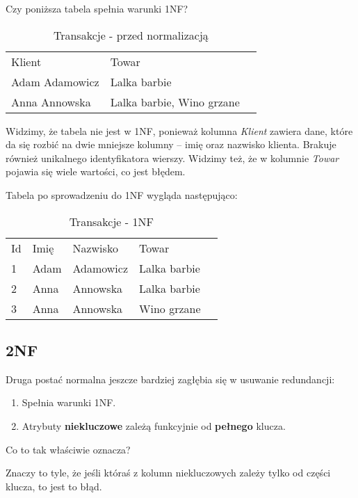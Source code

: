 Czy poniższa tabela spełnia warunki 1NF?

\begin{table}[H]
\centering
\caption{Transakcje - przed normalizacją}
\begin{tabular}{|l|l|l}
\cline{1-2}
Klient         & Towar          & \\ \cline{1-2}
Adam Adamowicz & Lalka barbie   & \\ \cline{1-2}
Anna Annowska  & Lalka barbie, Wino grzane &  \\ \cline{1-2}
\end{tabular}
\end{table}

Widzimy, że tabela nie jest w 1NF, ponieważ kolumna \textit{Klient} zawiera dane, które da się rozbić na dwie mniejsze kolumny -- imię oraz nazwisko klienta.
Brakuje również unikalnego identyfikatora wierszy.
Widzimy też, że w kolumnie \textit{Towar} pojawia się wiele wartości, co jest błędem.

Tabela po sprowadzeniu do 1NF wygląda następująco:
\begin{table}[H]
\centering
\caption{Transakcje - 1NF}
\begin{tabular}{|l|l|l|l|l}
\cline{1-4}
Id & Imię & Nazwisko  & Towar          & \\ \cline{1-4}
1  & Adam & Adamowicz & Lalka barbie   & \\ \cline{1-4}
2  & Anna & Annowska  & Lalka barbie   & \\ \cline{1-4}
3  & Anna & Annowska  & Wino grzane    & \\ \cline{1-4}
\end{tabular}
\end{table}

\subsection*{2NF}
	Druga postać normalna jeszcze bardziej zagłębia się w usuwanie redundancji:
\begin{enumerate}
	\item{Spełnia warunki 1NF.}
	\item{Atrybuty \textbf{niekluczowe} zależą funkcyjnie od \textbf{pełnego} klucza.}
\end{enumerate}

Co to tak właściwie oznacza?

Znaczy to tyle, że jeśli któraś z kolumn niekluczowych zależy tylko od części klucza, to jest to błąd.


